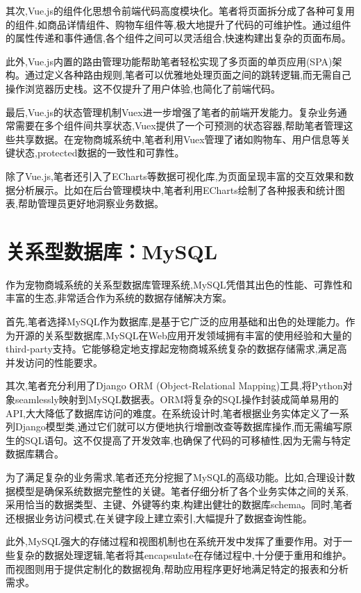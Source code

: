 其次,Vue.js的组件化思想令前端代码高度模块化。笔者将页面拆分成了各种可复用的组件,如商品详情组件、购物车组件等,极大地提升了代码的可维护性。通过组件的属性传递和事件通信,各个组件之间可以灵活组合,快速构建出复杂的页面布局。

此外,Vue.js内置的路由管理功能帮助笔者轻松实现了多页面的单页应用(SPA)架构。通过定义各种路由规则,笔者可以优雅地处理页面之间的跳转逻辑,而无需自己操作浏览器历史栈。这不仅提升了用户体验,也简化了前端代码。

最后,Vue.js的状态管理机制Vuex进一步增强了笔者的前端开发能力。复杂业务通常需要在多个组件间共享状态,Vuex提供了一个可预测的状态容器,帮助笔者管理这些共享数据。在宠物商城系统中,笔者利用Vuex管理了诸如购物车、用户信息等关键状态,protected数据的一致性和可靠性。

除了Vue.js,笔者还引入了ECharts等数据可视化库,为页面呈现丰富的交互效果和数据分析展示。比如在后台管理模块中,笔者利用ECharts绘制了各种报表和统计图表,帮助管理员更好地洞察业务数据。

\section{关系型数据库：MySQL}
作为宠物商城系统的关系型数据库管理系统,MySQL凭借其出色的性能、可靠性和丰富的生态,非常适合作为系统的数据存储解决方案。

首先,笔者选择MySQL作为数据库,是基于它广泛的应用基础和出色的处理能力。作为开源的关系型数据库,MySQL在Web应用开发领域拥有丰富的使用经验和大量的third-party支持。它能够稳定地支撑起宠物商城系统复杂的数据存储需求,满足高并发访问的性能要求。

其次,笔者充分利用了Django ORM (Object-Relational Mapping)工具,将Python对象seamlessly映射到MySQL数据表。ORM将复杂的SQL操作封装成简单易用的API,大大降低了数据库访问的难度。在系统设计时,笔者根据业务实体定义了一系列Django模型类,通过它们就可以方便地执行增删改查等数据库操作,而无需编写原生的SQL语句。这不仅提高了开发效率,也确保了代码的可移植性,因为无需与特定数据库耦合。

为了满足复杂的业务需求,笔者还充分挖掘了MySQL的高级功能。比如,合理设计数据模型是确保系统数据完整性的关键。笔者仔细分析了各个业务实体之间的关系,采用恰当的数据类型、主键、外键等约束,构建出健壮的数据库schema。同时,笔者还根据业务访问模式,在关键字段上建立索引,大幅提升了数据查询性能。

此外,MySQL强大的存储过程和视图机制也在系统开发中发挥了重要作用。对于一些复杂的数据处理逻辑,笔者将其encapsulate在存储过程中,十分便于重用和维护。而视图则用于提供定制化的数据视角,帮助应用程序更好地满足特定的报表和分析需求。

